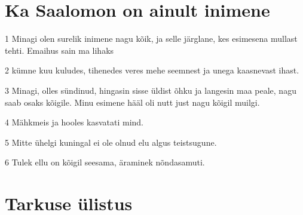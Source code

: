 \section*{Ka Saalomon on ainult inimene}

\par 1 Minagi olen surelik inimene nagu kõik, ja selle järglane, kes esimesena mullast tehti. Emaihus sain ma lihaks
\par 2 kümne kuu kuludes, tihenedes veres mehe seemnest ja unega kaasnevast ihast.
\par 3 Minagi, olles sündinud, hingasin sisse üldist õhku ja langesin maa peale, nagu saab osaks kõigile. Minu esimene hääl oli nutt just nagu kõigil muilgi.
\par 4 Mähkmeis ja hooles kasvatati mind.
\par 5 Mitte ühelgi kuningal ei ole olnud elu algus teistsugune.
\par 6 Tulek ellu on kõigil seesama, äraminek nõndasamuti. 

\section*{Tarkuse ülistus}

